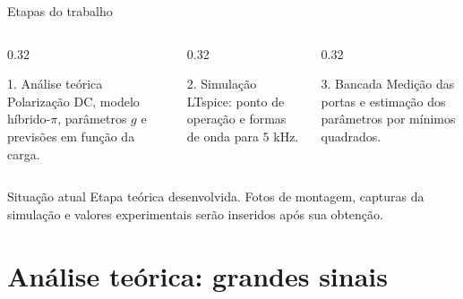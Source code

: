 \documentclass[aspectratio=169,11pt]{beamer}
\begin{document}
\begin{frame}{Etapas do trabalho}
  \begin{columns}[T,onlytextwidth]
    \begin{column}{0.32\textwidth}
      \begin{block}{1. Análise teórica}
        \small Polarização DC, modelo híbrido-$\pi$, parâmetros $g$ e
        previsões em função da carga.
      \end{block}
    \end{column}
    \begin{column}{0.32\textwidth}
      \begin{block}{2. Simulação}
        \small LTspice: ponto de operação e formas de onda para $5$ kHz.
      \end{block}
    \end{column}
    \begin{column}{0.32\textwidth}
      \begin{block}{3. Bancada}
        \small Medição das portas e estimação dos parâmetros por mínimos quadrados.
      \end{block}
    \end{column}
  \end{columns}
  \vspace{0.45cm}
  \begin{alertblock}{Situação atual}
    \small Etapa teórica desenvolvida. Fotos de montagem,
    capturas da simulação e valores experimentais serão inseridos após sua obtenção.
  \end{alertblock}
\end{frame}


\section{Análise teórica: grandes sinais}

\end{document}
